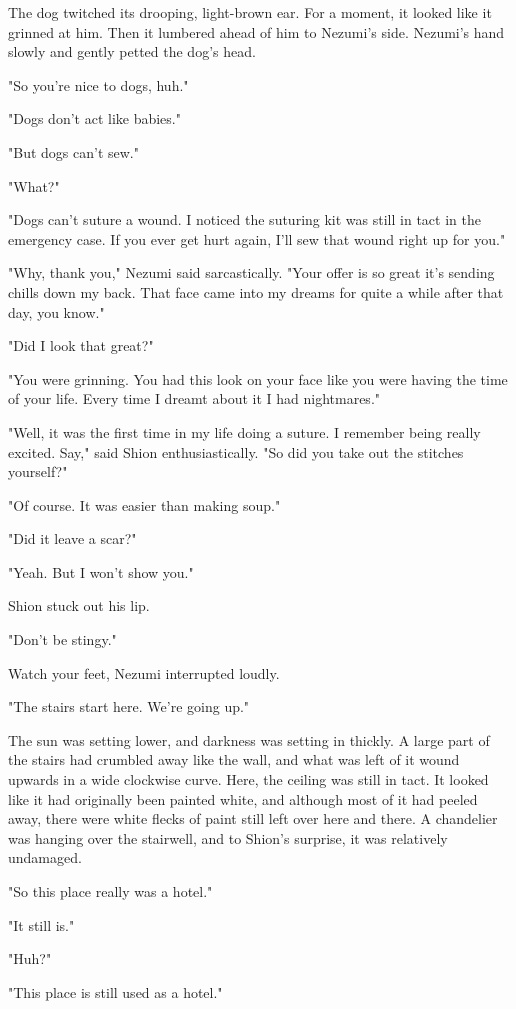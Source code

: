 The dog twitched its drooping, light-brown ear. For a moment, it looked
like it grinned at him. Then it lumbered ahead of him to Nezumi's side.
Nezumi's hand slowly and gently petted the dog's head.

"So you're nice to dogs, huh."

"Dogs don't act like babies."

"But dogs can't sew."

"What?"

"Dogs can't suture a wound. I noticed the suturing kit was still in tact
in the emergency case. If you ever get hurt again, I'll sew that wound
right up for you."

"Why, thank you," Nezumi said sarcastically. "Your offer is so great
it's sending chills down my back. That face came into my dreams for
quite a while after that day, you know."

"Did I look that great?"

"You were grinning. You had this look on your face like you were having
the time of your life. Every time I dreamt about it I had nightmares."

"Well, it was the first time in my life doing a suture. I remember being
really excited. Say," said Shion enthusiastically. "So did you take out
the stitches yourself?"

"Of course. It was easier than making soup."

"Did it leave a scar?"

"Yeah. But I won't show you."

Shion stuck out his lip.

"Don't be stingy."

Watch your feet, Nezumi interrupted loudly.

"The stairs start here. We're going up."

The sun was setting lower, and darkness was setting in thickly. A large
part of the stairs had crumbled away like the wall, and what was left of
it wound upwards in a wide clockwise curve. Here, the ceiling was still
in tact. It looked like it had originally been painted white, and
although most of it had peeled away, there were white flecks of paint
still left over here and there. A chandelier was hanging over the
stairwell, and to Shion's surprise, it was relatively undamaged.

"So this place really was a hotel."

"It still is."

"Huh?"

"This place is still used as a hotel."

